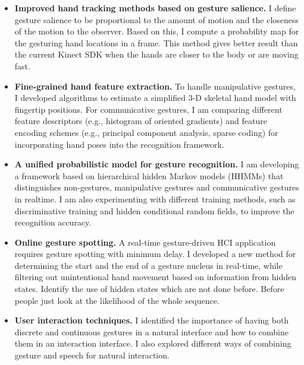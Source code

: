 \begin{itemize}
  \item \textbf{Improved hand tracking methods based on gesture salience.}
  I define gesture salience to be proportional to the amount of motion and the
  closeness of the motion to the observer. Based on this, I compute a
  probability map for the gesturing hand locations in a frame. This method
  gives better result than the current Kinect SDK when the hands are closer to
  the body or are moving fast.

  \item \textbf{Fine-grained hand feature extraction.} To handle manipulative
  gestures, I developed algorithms to estimate a simplified 3-D
  skeletal hand model with fingertip positions. For communicative gestures, I am
  comparing different feature descriptors (e.g., histogram of oriented
  gradients) and feature encoding schemes (e.g., principal component analysis,
  sparse coding) for incorporating hand poses into the recognition framework.

  \item \textbf{A unified probabilistic model for gesture recognition.} I am
  developing a framework based on hierarchical hidden Markov
  models (HHMMs) that distinguishes non-gestures, 
  manipulative gestures and communicative gestures in realtime. I am also experimenting with different
  training methods, such as discriminative training and hidden conditional
  random fields, to improve the recognition accuracy. 

  \item \textbf{Online gesture spotting.} A real-time gesture-driven HCI
  application requires gesture spotting with minimum delay. I developed a new
  method for determining the start and the end of a gesture nucleus in
  real-time, while filtering out unintentional hand movement based on
  information from hidden states. Identify the use of hidden states which are
  not done before. Before people just look at the likelihood of the whole
  sequence.
  
  \item \textbf{User interaction techniques.} I identified the importance of
  having both discrete and continuous gestures in a natural interface and how to
  combine them in an interaction interface. I also explored different ways of
  combining gesture and speech for natural interaction.
\end{itemize}

